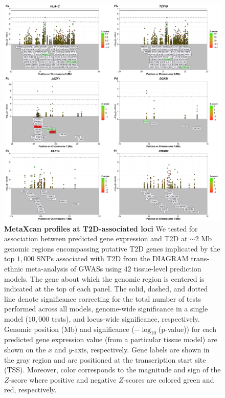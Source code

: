\documentclass[10pt]{article}
\begin{document}
\begin{figure}
\ContinuedFloat
\includegraphics[width=\textwidth]{sup_fig1_part6_locusArray.pdf}
	\caption{\textbf{MetaXcan profiles at T2D-associated loci} We tested for association between predicted gene expression and T2D at $\sim2$ Mb genomic regions encompassing putative T2D genes implicated by the top $1,000$ SNPs associated with T2D from the DIAGRAM trans-ethnic meta-analysis of GWASs using $42$ tissue-level prediction models. The gene about which the genomic region is centered is indicated at the top of each panel. The solid, dashed, and dotted line denote significance correcting for the total number of tests performed across all models, genome-wide significance in a single model ($10,000$ tests), and locus-wide significance, respectively. Genomic position (Mb) and significance ($-\log_{10}$(p-value)) for each predicted gene expression value (from a particular tissue model) are shown on the $x$ and $y$-axis, respectively. Gene labels are shown in the gray region and are positioned at the transcription start site (TSS). Moreover, color corresponds to the magnitude and sign of the $Z$-score where positive and negative $Z$-scores are colored green and red, respectively.} 
    \label{fig:supp.locus_array_fig1_part6}
\end{figure}
\end{document}
